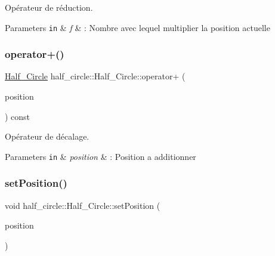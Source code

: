 Opérateur de réduction. 


\begin{DoxyParams}[1]{Parameters}
\mbox{\tt in}  & {\em f} & \+: Nombre avec lequel multiplier la position actuelle \\
\hline
\end{DoxyParams}
\mbox{\label{classhalf__circle_1_1_half___circle_aad1321266f1c80f93426c7b0f906700b}} 
\subsubsection{\texorpdfstring{operator+()}{operator+()}}
{\footnotesize\ttfamily \hyperlink{classhalf__circle_1_1_half___circle}{Half\+\_\+\+Circle} half\+\_\+circle\+::\+Half\+\_\+\+Circle\+::operator+ (\begin{DoxyParamCaption}\item[{const \hyperlink{classns_graphics_1_1_vec2_d}{ns\+Graphics\+::\+Vec2D} \&}]{position }\end{DoxyParamCaption}) const}



Opérateur de décalage. 


\begin{DoxyParams}[1]{Parameters}
\mbox{\tt in}  & {\em position} & \+: Position a additionner \\
\hline
\end{DoxyParams}
\mbox{\label{classhalf__circle_1_1_half___circle_aef4c8e9f8a7d86c0062511ee24646afa}} 
\subsubsection{\texorpdfstring{set\+Position()}{setPosition()}}
{\footnotesize\ttfamily void half\+\_\+circle\+::\+Half\+\_\+\+Circle\+::set\+Position (\begin{DoxyParamCaption}\item[{const \hyperlink{classns_graphics_1_1_vec2_d}{ns\+Graphics\+::\+Vec2D} \&}]{position }\end{DoxyParamCaption})}



